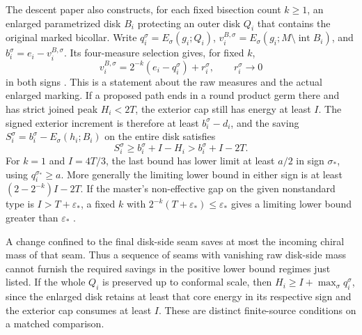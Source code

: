 \documentclass[11pt,letterpaper]{article}
\numberwithin{equation}{section}
\begin{document}
The descent paper also constructs, for each fixed bisection count
\(k\ge1\), an enlarged parametrized disk \(B_i\) protecting an
outer disk \(Q_i\) that contains the original marked bicollar.
Write \(q_i^\sigma=E_\sigma(g_i;Q_i)\),
\(v_i^{B,\sigma}=E_\sigma(g_i;M\setminus\operatorname{int}B_i)\),
and \(b_i^\sigma=e_i-v_i^{B,\sigma}\). Its four-measure
selection gives, for fixed \(k\),
\[
 v_i^{B,\sigma}=2^{-k}(e_i-q_i^\sigma)+r_i^\sigma,
 \qquad r_i^\sigma\longrightarrow0
\]
in both signs \cite[Retaining the marked core inside a larger disk]{Baker2026FixedDescent}.
This is a statement about the raw measures and the actual enlarged
marking. If a proposed path ends in a round product germ there
and has strict joined peak \(H_i<2T\), the exterior cap still
has energy at least \(I\). The signed exterior increment is
therefore at least \(b_i^\sigma-d_i\), and the saving
\(S_i^\sigma=b_i^\sigma-E_\sigma(h_i;B_i)\) on the entire
disk satisfies
\[
 S_i^\sigma\ge b_i^\sigma+I-H_i>b_i^\sigma+I-2T .
\]
For \(k=1\) and \(I=4T/3\), the last bound has lower limit at
least \(a/2\) in sign \(\sigma_*\), using \(q_i^{\sigma_*}\ge a\).
More generally the limiting lower bound in either sign is at
least \((2-2^{-k})I-2T\). If the master's non-effective gap on
the given nonstandard type is \(I>T+\varepsilon_*\), a fixed
\(k\) with \(2^{-k}(T+\varepsilon_*)\le\varepsilon_*\) gives a
limiting lower bound greater than \(\varepsilon_*\)
\cite[Uniform recognition by the Weyl spectrum]{Baker2026ChiralMaster}.

A change confined to the final disk-side seam saves at most
the incoming chiral mass of that seam. Thus a sequence of
seams with vanishing raw disk-side mass cannot furnish the
required savings in the positive lower bound regimes just
listed. If the whole \(Q_i\) is preserved up to conformal
scale, then \(H_i\ge I+\max_\sigma q_i^\sigma\), since the
enlarged disk retains at least that core energy in its
respective sign and the exterior cap consumes at least \(I\).
These are distinct finite-source conditions on a matched
comparison.
\end{document}
